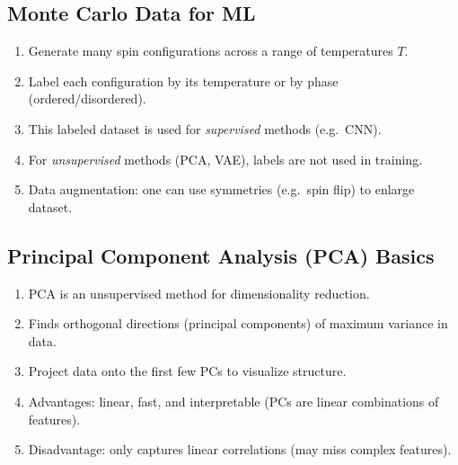\documentclass[%
oneside,                 %
final,                   %
10pt]{article}
\begin{document}
\subsection{Monte Carlo Data for ML}
\begin{enumerate}
\item Generate many spin configurations across a range of temperatures $T$.

\item Label each configuration by its temperature or by phase (ordered/disordered).

\item This labeled dataset is used for \emph{supervised} methods (e.g.\ CNN).

\item For \emph{unsupervised} methods (PCA, VAE), labels are not used in training.

\item Data augmentation: one can use symmetries (e.g.\ spin flip) to enlarge dataset.
\end{enumerate}

\noindent
\subsection{Principal Component Analysis (PCA) Basics}

\begin{enumerate}
\item PCA is an unsupervised method for dimensionality reduction.

\item Finds orthogonal directions (principal components) of maximum variance in data.

\item Project data onto the first few PCs to visualize structure.

\item Advantages: linear, fast, and interpretable (PCs are linear combinations of features).

\item Disadvantage: only captures linear correlations (may miss complex features).
\end{enumerate}

\noindent
\end{document}
